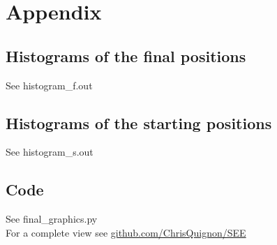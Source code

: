 \documentclass{scrartcl}
\begin{document}



\section{Appendix}
\subsection{Histograms of the final positions}
See histogram\_f.out


\subsection{Histograms of the starting positions}
See histogram\_s.out


\subsection{Code}
See final\_graphics.py\\
For a complete view see \href{https://github.com/ChrisQuignon/SEE/tree/master/Homework04}{github.com/ChrisQuignon/SEE}











%


\end{document}
